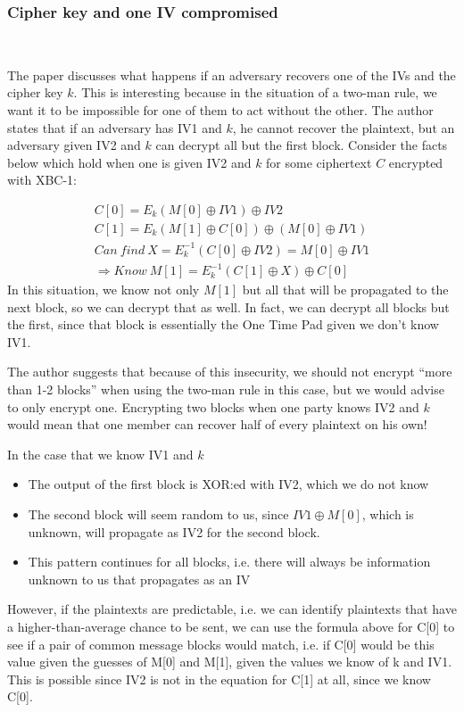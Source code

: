 \documentclass[conference]{IEEEtran}
\begin{document}
\subsubsection{Cipher key and one IV compromised} \

The paper discusses what happens if an adversary recovers one of the IVs and the cipher key $k$. This is interesting because in the situation of a two-man rule, we want it to be impossible for one of them to act without the other. The author states that if an adversary has IV1 and $k$, he cannot recover the plaintext, but an adversary given IV2 and $k$ can decrypt all but the first block. Consider the facts below which hold when one is given IV2 and $k$ for some ciphertext $C$ encrypted with XBC-1:

\begin{gather*}
  C[0] = E_k(M[0] \oplus IV1) \oplus IV2 \\
  C[1] = E_k(M[1] \oplus C[0]) \oplus (M[0] \oplus IV1) \\
  Can\ find\ X = E_k^{-1}(C[0] \oplus IV2) = M[0] \oplus IV1 \\
  \Rightarrow Know\ M[1] = E_k^{-1}(C[1] \oplus X) \oplus C[0]
\end{gather*}
In this situation, we know not only $M[1]$ but all that will be propagated to the next block, so we can decrypt that as well. In fact, we can decrypt all blocks but the first, since that block is essentially the One Time Pad given we don't know IV1.

The author suggests that because of this insecurity, we should not encrypt ``more than 1-2 blocks'' when using the two-man rule in this case, but we would advise to only encrypt one. Encrypting two blocks when one party knows IV2 and $k$ would mean that one member can recover half of every plaintext on his own!

In the case that we know IV1 and $k$
\begin{itemize}
 \item The output of the first block is XOR:ed with IV2, which we do not know
 \item The second block will seem random to us, since $IV1 \oplus M[0]$, which is unknown, will propagate as IV2 for the second block.
 \item This pattern continues for all blocks, i.e. there will always be information unknown to us that propagates as an IV
\end{itemize}

However, if the plaintexts are predictable, i.e. we can identify plaintexts that have a higher-than-average chance to be sent, we can use the formula above for C[0] to see if a pair of common message blocks would match, i.e. if C[0] would be this value given the guesses of M[0] and M[1], given the values we know of k and IV1. This is possible since IV2 is not in the equation for C[1] at all, since we know C[0].
\end{document}
